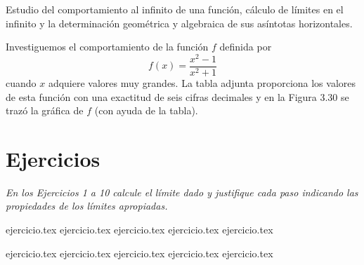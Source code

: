
Estudio del comportamiento al infinito de una función, cálculo de límites en el infinito y la determinación geométrica y algebraica de sus asíntotas horizontales.

Investiguemos el comportamiento de la función $f$ definida por
$$f(x) = \frac{x^2 - 1}{x^2 + 1}$$
cuando $x$ adquiere valores muy grandes. La tabla adjunta proporciona los valores de esta función con una exactitud de seis cifras decimales y en la Figura 3.30 se trazó la gráfica de $f$ (con ayuda de la tabla).

\begin{center}
\end{center}

\vspace{1.5em}
\section*{Ejercicios}

\noindent \textit{En los Ejercicios 1 a 10 calcule el límite dado y justifique cada paso indicando las propiedades de los límites apropiadas.}

\begin{enumerate}
    \begin{minipage}{0.45\textwidth}
    {ejercicio.tex}
    {ejercicio.tex}
    {ejercicio.tex}
    {ejercicio.tex}
    {ejercicio.tex}
    \end{minipage}%
    \begin{minipage}{0.45\textwidth}
    {ejercicio.tex}
    {ejercicio.tex}
    {ejercicio.tex}
    {ejercicio.tex}
    {ejercicio.tex}
    \end{minipage}
\end{enumerate}

